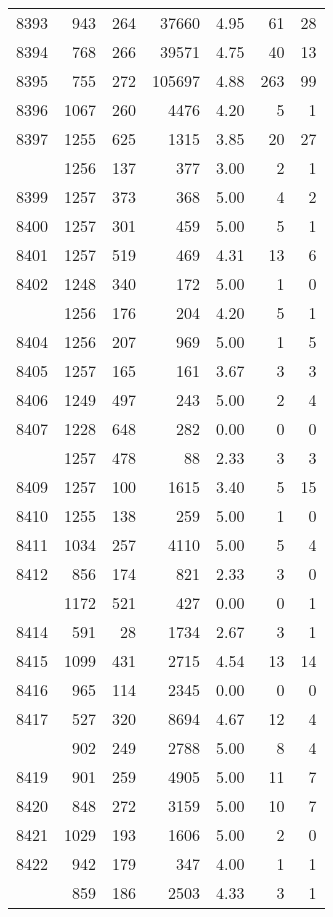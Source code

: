 \documentclass[
]{article}
\begin{document}
\begin{table}
\begin{tabular}[t]{lrrrrrr}
8393 & 943 & 264 & 37660 & 4.95 & 61 & 28\\
8394 & 768 & 266 & 39571 & 4.75 & 40 & 13\\
8395 & 755 & 272 & 105697 & 4.88 & 263 & 99\\
8396 & 1067 & 260 & 4476 & 4.20 & 5 & 1\\
8397 & 1255 & 625 & 1315 & 3.85 & 20 & 27\\
\addlinespace
8398 & 1256 & 137 & 377 & 3.00 & 2 & 1\\
8399 & 1257 & 373 & 368 & 5.00 & 4 & 2\\
8400 & 1257 & 301 & 459 & 5.00 & 5 & 1\\
8401 & 1257 & 519 & 469 & 4.31 & 13 & 6\\
8402 & 1248 & 340 & 172 & 5.00 & 1 & 0\\
\addlinespace
8403 & 1256 & 176 & 204 & 4.20 & 5 & 1\\
8404 & 1256 & 207 & 969 & 5.00 & 1 & 5\\
8405 & 1257 & 165 & 161 & 3.67 & 3 & 3\\
8406 & 1249 & 497 & 243 & 5.00 & 2 & 4\\
8407 & 1228 & 648 & 282 & 0.00 & 0 & 0\\
\addlinespace
8408 & 1257 & 478 & 88 & 2.33 & 3 & 3\\
8409 & 1257 & 100 & 1615 & 3.40 & 5 & 15\\
8410 & 1255 & 138 & 259 & 5.00 & 1 & 0\\
8411 & 1034 & 257 & 4110 & 5.00 & 5 & 4\\
8412 & 856 & 174 & 821 & 2.33 & 3 & 0\\
\addlinespace
8413 & 1172 & 521 & 427 & 0.00 & 0 & 1\\
8414 & 591 & 28 & 1734 & 2.67 & 3 & 1\\
8415 & 1099 & 431 & 2715 & 4.54 & 13 & 14\\
8416 & 965 & 114 & 2345 & 0.00 & 0 & 0\\
8417 & 527 & 320 & 8694 & 4.67 & 12 & 4\\
\addlinespace
8418 & 902 & 249 & 2788 & 5.00 & 8 & 4\\
8419 & 901 & 259 & 4905 & 5.00 & 11 & 7\\
8420 & 848 & 272 & 3159 & 5.00 & 10 & 7\\
8421 & 1029 & 193 & 1606 & 5.00 & 2 & 0\\
8422 & 942 & 179 & 347 & 4.00 & 1 & 1\\
\addlinespace
8423 & 859 & 186 & 2503 & 4.33 & 3 & 1\\

\end{tabular}
\end{table}
\end{document}

